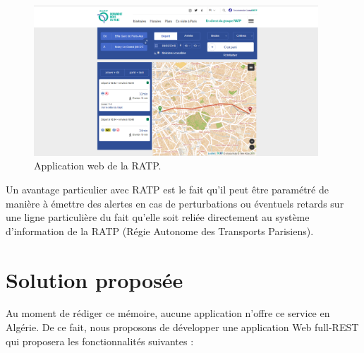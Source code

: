 \begin{figure}[h!]
	\center
	\includegraphics[width=0.95\textwidth]{img/ratp.png}
	\caption{Application web de la RATP.}
\end{figure}
Un avantage particulier avec RATP est le fait qu'il peut être paramétré de manière à émettre des alertes en cas de perturbations ou éventuels retards sur une ligne particulière du fait qu'elle soit reliée directement au système d'information de la RATP (Régie Autonome des Transports Parisiens).

\section{Solution proposée}
Au moment de rédiger ce mémoire, aucune application n'offre ce service en Algérie. \newline
De ce fait, nous proposons de développer une application Web full-REST qui proposera les fonctionnalités suivantes : 

